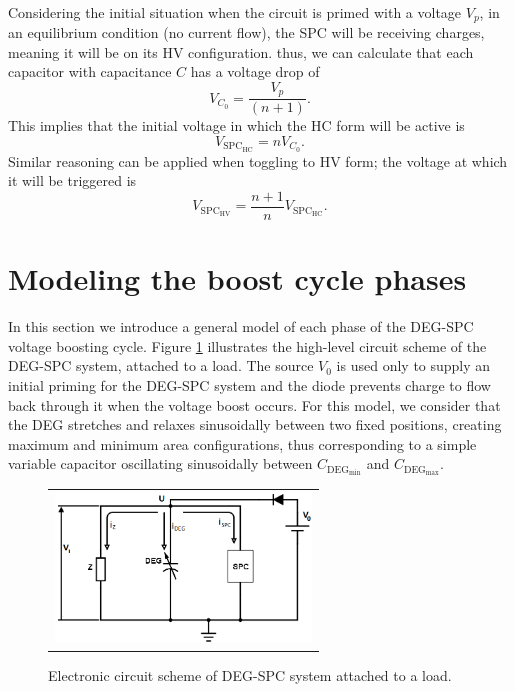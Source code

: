 \paragraph{} Considering the initial situation when the circuit is primed with a voltage $V_p$, in an equilibrium condition (no current flow), the SPC will be receiving charges, meaning it will be on its HV configuration. thus, we can calculate that each capacitor with capacitance $C$ has a voltage drop of
\begin{equation}
V_{C_{0}}=\frac{V_{p}}{(n+1)}.
\end{equation}
This implies that the initial voltage in which the HC form will be active is
\begin{equation}
V_{\text{SPC}_\text{HC}} = nV_{C_{0}}.
\end{equation}
Similar reasoning can be applied when toggling to HV form; the voltage at which it will be triggered is
\begin{equation}
V_{\text{SPC}_\text{HV}} = \frac{n+1}{n}V_{\text{SPC}_\text{HC}}.
\end{equation}

\section{Modeling the boost cycle phases}
In this section we introduce a general model of each phase of the DEG-SPC voltage boosting cycle.  Figure \ref{fig:circuit} illustrates the high-level circuit scheme of the DEG-SPC system, attached to a load. The source $V_0$ is used only to supply an initial priming for the DEG-SPC system and the diode prevents charge to flow back through it when the voltage boost occurs. For this model, we consider that the DEG stretches and relaxes sinusoidally between two fixed positions, creating maximum and minimum area configurations, thus corresponding to a simple variable capacitor oscillating sinusoidally between $C_{\text{DEG}_\text{min}}$ and $C_{\text{DEG}_\text{max}}$.

\begin{figure}[ht]
\begin{center}
\begin{tabular}{c}
\includegraphics[height=4cm]{fig03/schemeit-project3.png}\\
\end{tabular}
\end{center}
\caption 
{ \label{fig:circuit}
Electronic circuit scheme of DEG-SPC system attached to a load.} 
\end{figure}

